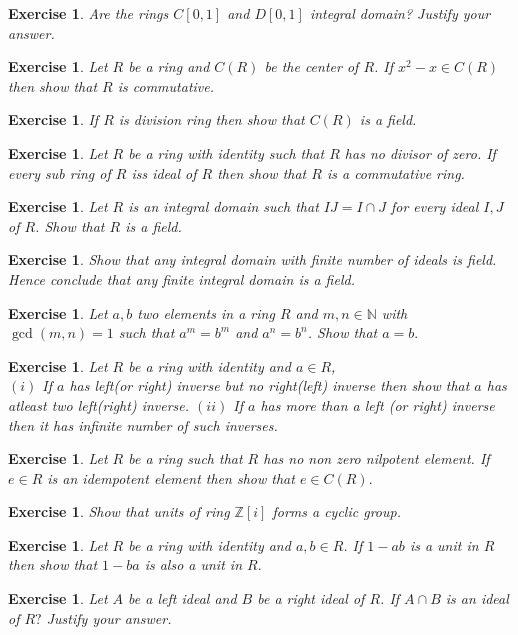 \documentclass[11pt]{amsart}
\newtheorem{ex}[theorem]{Exercise}
\newcommand{\ZZ}{\mathbb Z}
\newcommand{\NN}{\mathbb N}
\begin{document}
\begin{ex}
Are the rings $C[0,1]$ and $D[0,1]$ integral domain? Justify your answer.
\end{ex}
\begin{ex}
Let $R$ be a ring and $C(R)$ be the center of $R$. If $x^2-x\in C(R)$ then show that $R$ is commutative.
\end{ex}
\begin{ex}
If $R$ is division ring then show that $C(R)$ is a field.
\end{ex}		
\begin{ex}
Let $R$ be a ring with identity such that $R$ has no divisor of zero. If every sub ring of $R$ iss ideal of $R$ then show that $R$ is a commutative ring.
\end{ex}
\begin{ex}
Let $R$ is an integral domain such that $IJ=I\cap J$ for every ideal $I,J$ of $R$. Show that $R$ is a field.
\end{ex}
\begin{ex}
Show that any integral domain with finite number of ideals is field. Hence conclude  that any finite integral domain is a field.
\end{ex}
\begin{ex}
Let $a,b$ two elements in a ring $R$ and $m,n\in {\NN}$ with $\gcd(m,n)=1$ such that $a^m=b^m$ and $a^n=b^n$. Show that $a=b.$
\end{ex}
\begin{ex}
Let $R$ be a ring with identity and $a\in R$,\\
$(i)$ If $a$ has left(or right) inverse but no right(left) inverse then show that $a$ has atleast two left(right) inverse.
$(ii)$ If $a$ has more than a left (or right) inverse then it has infinite number of such inverses.
\end{ex}
\begin{ex}
Let $R$ be a ring such that $R$ has no non zero nilpotent element. If $e\in R$ is an idempotent element then show that $e\in C(R).$
\end{ex}
\begin{ex}
Show that units of ring ${\ZZ}[i]$ forms a cyclic group.
\end{ex}
\begin{ex}
Let $R$ be a ring with identity and $a,b\in R$. If $ 1-ab$ is a unit in $R$ then show that $1-ba$ is also a unit in $R.$
\end{ex}
\begin{ex}
Let $A$ be a left ideal and $B$ be a right ideal of $R$. If $A\cap B$ is an ideal of $R?$ Justify your answer.
\end{ex}
\end{document}
